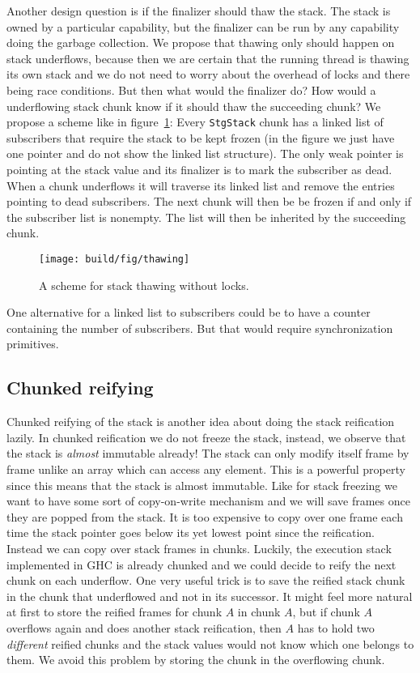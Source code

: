 Another design question is if the finalizer should thaw the stack. The
stack is owned by a particular capability, but the finalizer can be run by
any capability doing the garbage collection. We propose that thawing only
should happen on stack underflows, because then we are certain that the running
thread is thawing its own stack and we do not need to worry about the overhead of
locks and there being race conditions. But then what would the finalizer do? How would a underflowing
stack chunk know if it should thaw the succeeding chunk? We propose a scheme like in figure~\ref{fig:thawing}:
Every \texttt{StgStack} chunk has a linked list of subscribers that require the
stack to be kept frozen (in the figure we just have one pointer and do
not show the linked list structure). The only weak pointer is pointing at the stack value
and its finalizer is to mark the subscriber as dead. When a chunk underflows it
will traverse its linked list and remove the entries pointing to dead
subscribers. The next chunk will then be be frozen if and only if the subscriber list is nonempty.
The list will then be inherited by the succeeding chunk.

\begin{figure}
\begin{mdframed}
  \texttt{[image: build/fig/thawing]}
  \caption{A scheme for stack thawing without locks.}
  \label{fig:thawing}
\end{mdframed}
\end{figure}

One alternative for a linked list to subscribers could be to have a counter
containing the number of subscribers. But that would require synchronization
primitives.

\subsection{Chunked reifying} \label{sec:chunked_reifying}

Chunked reifying of the stack is another idea about doing the stack
reification lazily. In chunked reification we do not freeze the stack, instead, we observe
that the stack is \emph{almost} immutable already! The stack can only
modify itself frame by frame unlike an array which can access any
element. This is a powerful property since this means that the stack is
almost immutable. Like for stack freezing we want to have some sort of
copy-on-write mechanism and we will save frames once they are popped from
the stack. It is too expensive to copy over one frame each time the
stack pointer goes below its yet lowest point since the reification. Instead we
can copy over stack frames in chunks.
Luckily, the execution stack implemented in GHC is already chunked
and we could decide to reify the next chunk on each underflow.
One very useful trick is to save the reified stack chunk in the chunk that
underflowed and not in its successor. It might feel more natural at first to
store the reified frames for chunk $A$ in chunk $A$, but if chunk $A$ overflows
again and does another stack reification, then $A$ has to hold two
\emph{different} reified chunks and the stack values would not know which one
belongs to them. We avoid this problem by storing the chunk in the overflowing chunk.

